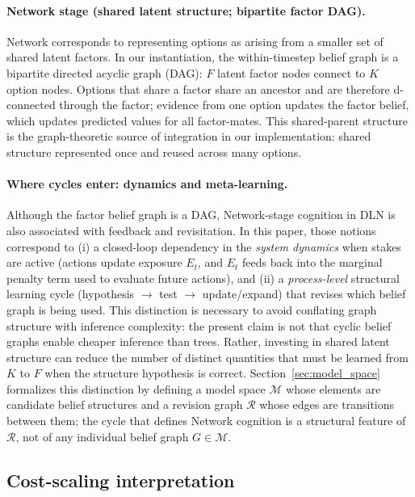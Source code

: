 \documentclass[11pt]{article}
\begin{document}
\paragraph{Network stage (shared latent structure; bipartite factor DAG).}
Network corresponds to representing options as arising from a smaller set of shared latent factors.
In our instantiation, the within-timestep belief graph is a bipartite directed acyclic graph (DAG): $F$ latent factor nodes connect to $K$ option nodes.
Options that share a factor share an ancestor and are therefore d-connected through the factor; evidence from one option updates the factor belief, which updates predicted values for all factor-mates.
This shared-parent structure is the graph-theoretic source of integration in our implementation: shared structure represented once and reused across many options.

\paragraph{Where cycles enter: dynamics and meta-learning.}
Although the factor belief graph is a DAG, Network-stage cognition in DLN is also associated with feedback and revisitation.
In this paper, those notions correspond to (i) a closed-loop dependency in the \emph{system dynamics} when stakes are active (actions update exposure $E_t$, and $E_t$ feeds back into the marginal penalty term used to evaluate future actions), and (ii) a \emph{process-level} structural learning cycle (hypothesis $\rightarrow$ test $\rightarrow$ update/expand) that revises which belief graph is being used.
This distinction is necessary to avoid conflating graph structure with inference complexity: the present claim is not that cyclic belief graphs enable cheaper inference than trees. Rather, investing in shared latent structure can reduce the number of distinct quantities that must be learned from $K$ to $F$ when the structure hypothesis is correct.
Section~\ref{sec:model_space} formalizes this distinction by defining a model
space $\mathcal{M}$ whose elements are candidate belief structures and a
revision graph $\mathcal{R}$ whose edges are transitions between them; the cycle
that defines Network cognition is a structural feature of $\mathcal{R}$, not of
any individual belief graph $G\in\mathcal{M}$.

\subsection{Cost-scaling interpretation}
\end{document}

